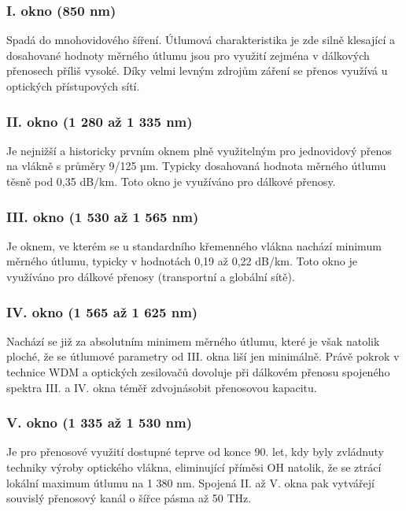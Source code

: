 \subsubsection{I. okno (850 nm)}
Spadá do mnohovidového šíření. Útlumová charakteristika je zde silně klesající a dosahované hodnoty měrného útlumu jsou pro využití zejména v dálkových přenosech příliš vysoké. Díky velmi levným zdrojům záření se přenos využívá u optických přístupových sítí.

\subsubsection{II. okno (1 280 až 1 335 nm)}
Je nejnižší a historicky prvním oknem plně využitelným pro jednovidový přenos na vlákně s průměry 9/125 µm. Typicky dosahovaná hodnota měrného útlumu těsně pod 0,35 dB/km. Toto okno je využíváno pro dálkové přenosy.

\subsubsection{III. okno (1 530 až 1 565 nm)}
Je oknem, ve kterém se u standardního křemenného vlákna nachází minimum měrného útlumu, typicky v hodnotách 0,19 až 0,22 dB/km. Toto okno je využíváno pro dálkové přenosy (transportní a globální sítě).

\subsubsection{IV. okno (1 565 až 1 625 nm)}
Nachází se již za absolutním minimem měrného útlumu, které je však natolik ploché, že se útlumové parametry od III. okna liší jen minimálně. Právě pokrok v technice WDM a optických zesilovačů dovoluje při dálkovém přenosu spojeného spektra III. a IV. okna téměř zdvojnásobit přenosovou kapacitu.

\subsubsection{V. okno (1 335 až 1 530 nm)}
Je pro přenosové využití dostupné teprve od konce 90. let, kdy byly zvládnuty techniky výroby optického vlákna, eliminující příměsi OH natolik, že se ztrácí lokální maximum útlumu na 1 380 nm. Spojená II. až V. okna pak vytvářejí souvislý přenosový kanál o šířce pásma až 50 THz.

